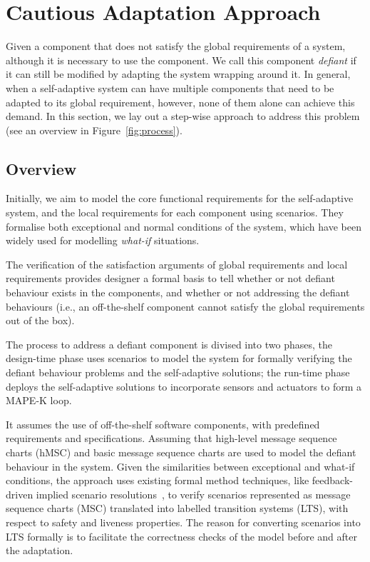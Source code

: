 \section{Cautious Adaptation Approach}

Given a component that does not satisfy the global requirements of a system, although it is necessary to use the component. We call this component {\em defiant} if it can still be modified by adapting the system wrapping around it. In general, when a self-adaptive system can have multiple components that need to be adapted to its global requirement, however, none of them alone can achieve this demand. In this section, we lay out a step-wise approach to address this problem (see an overview in Figure~\ref{fig:process}).

\subsection{Overview}

Initially, we aim to model the core functional requirements for the self-adaptive system, and the local requirements for each component using scenarios. They formalise both exceptional and normal conditions of the system, which have been widely used for modelling {\it what-if} situations. 

The verification of the satisfaction arguments of global requirements and local requirements provides designer a formal basis to tell whether or not defiant behaviour exists in the components, and whether or not addressing the defiant behaviours (i.e., an off-the-shelf component cannot satisfy the global requirements out of the box). 

The process to address a defiant component is divised into two phases, the design-time phase uses scenarios to model the system for formally verifying the defiant behaviour problems and the self-adaptive solutions; the run-time phase deploys the self-adaptive solutions to incorporate sensors and actuators to form a MAPE-K loop.  

It assumes the use of off-the-shelf software components, with predefined requirements and specifications. 
Assuming that high-level message sequence charts (hMSC) and basic message sequence charts are used to model the defiant behaviour in the system.  Given the similarities between exceptional and what-if conditions, the approach uses existing formal method techniques, like feedback-driven implied scenario resolutions~\cite{uchitel:2013}, to verify scenarios represented as message sequence charts (MSC) translated into labelled transition systems (LTS), with respect to safety and liveness properties. 
The reason for converting scenarios into LTS formally is to facilitate the correctness checks of the model before and after the adaptation.

